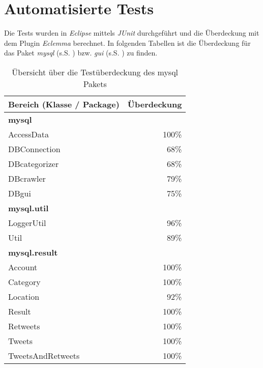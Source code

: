 \section{Automatisierte Tests}
Die Tests wurden in \emph{Eclipse} mittels \emph{JUnit} durchgeführt und die Überdeckung mit dem Plugin \emph{Eclemma} berechnet.
In folgenden Tabellen ist die Überdeckung für das Paket \emph{mysql} (s.S. \pageref{tbl:coverageMysql}) bzw. \emph{gui}
(s.S. \pageref{tbl:coverageGui}) zu finden.
\begin{table}[h]
	\centering
	\begin{tabular} {l||r}
		\label{tbl:coverageMysql}
		Bereich (Klasse / Package) & Überdeckung \\
		\hline
		\hline
		\textbf{mysql} & \\
		\hspace*{3mm}AccessData & 100\% \\
		\hspace*{3mm}DBConnection & 68\% \\
		\hspace*{3mm}DBcategorizer & 68\% \\
		\hspace*{3mm}DBcrawler & 79\% \\
		\hspace*{3mm}DBgui & 75\% \\
		\hline
		\textbf{mysql.util} & \\
		\hspace*{3mm}LoggerUtil & 96\% \\
		\hspace*{3mm}Util & 89\% \\
		\hline
		\textbf{mysql.result} & \\
		\hspace*{3mm}Account & 100\% \\
		\hspace*{3mm}Category & 100\% \\
		\hspace*{3mm}Location & 92\% \\
		\hspace*{3mm}Result & 100\% \\
		\hspace*{3mm}Retweets & 100\% \\
		\hspace*{3mm}Tweets & 100\% \\
		\hspace*{3mm}TweetsAndRetweets & 100\% \\
	\end{tabular}
	\caption{Übersicht über die Testüberdeckung des mysql Pakets}
\end{table}
